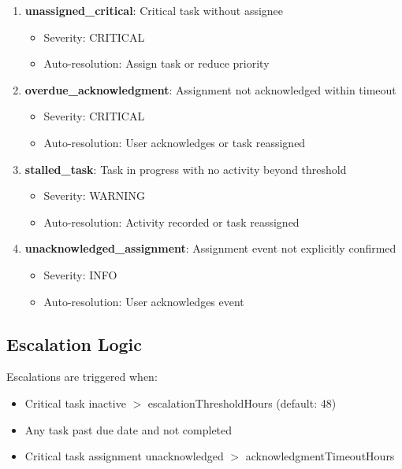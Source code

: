 \documentclass[12pt,a4paper]{article}
\begin{document}
\begin{enumerate}
  \item \textbf{unassigned\_critical}: Critical task without assignee
  \begin{itemize}
    \item Severity: CRITICAL
    \item Auto-resolution: Assign task or reduce priority
  \end{itemize}

  \item \textbf{overdue\_acknowledgment}: Assignment not acknowledged within timeout
  \begin{itemize}
    \item Severity: CRITICAL
    \item Auto-resolution: User acknowledges or task reassigned
  \end{itemize}

  \item \textbf{stalled\_task}: Task in progress with no activity beyond threshold
  \begin{itemize}
    \item Severity: WARNING
    \item Auto-resolution: Activity recorded or task reassigned
  \end{itemize}

  \item \textbf{unacknowledged\_assignment}: Assignment event not explicitly confirmed
  \begin{itemize}
    \item Severity: INFO
    \item Auto-resolution: User acknowledges event
  \end{itemize}
\end{enumerate}

\subsection{Escalation Logic}

Escalations are triggered when:

\begin{itemize}
  \item Critical task inactive $>$ escalationThresholdHours (default: 48)
  \item Any task past due date and not completed
  \item Critical task assignment unacknowledged $>$ acknowledgmentTimeoutHours
\end{itemize}
\end{document}
